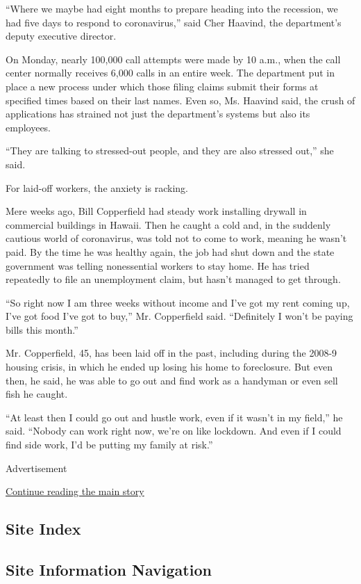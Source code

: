 ``Where we maybe had eight months to prepare heading into the recession,
we had five days to respond to coronavirus,'' said Cher Haavind, the
department's deputy executive director.

On Monday, nearly 100,000 call attempts were made by 10 a.m., when the
call center normally receives 6,000 calls in an entire week. The
department put in place a new process under which those filing claims
submit their forms at specified times based on their last names. Even
so, Ms. Haavind said, the crush of applications has strained not just
the department's systems but also its employees.

``They are talking to stressed-out people, and they are also stressed
out,'' she said.

For laid-off workers, the anxiety is racking.

Mere weeks ago, Bill Copperfield had steady work installing drywall in
commercial buildings in Hawaii. Then he caught a cold and, in the
suddenly cautious world of coronavirus, was told not to come to work,
meaning he wasn't paid. By the time he was healthy again, the job had
shut down and the state government was telling nonessential workers to
stay home. He has tried repeatedly to file an unemployment claim, but
hasn't managed to get through.

``So right now I am three weeks without income and I've got my rent
coming up, I've got food I've got to buy,'' Mr. Copperfield said.
``Definitely I won't be paying bills this month.''

Mr. Copperfield, 45, has been laid off in the past, including during the
2008-9 housing crisis, in which he ended up losing his home to
foreclosure. But even then, he said, he was able to go out and find work
as a handyman or even sell fish he caught.

``At least then I could go out and hustle work, even if it wasn't in my
field,'' he said. ``Nobody can work right now, we're on like lockdown.
And even if I could find side work, I'd be putting my family at risk.''

Advertisement

\protect\hyperlink{after-bottom}{Continue reading the main story}

\hypertarget{site-index}{%
\subsection{Site Index}\label{site-index}}

\hypertarget{site-information-navigation}{%
\subsection{Site Information
Navigation}\label{site-information-navigation}}

